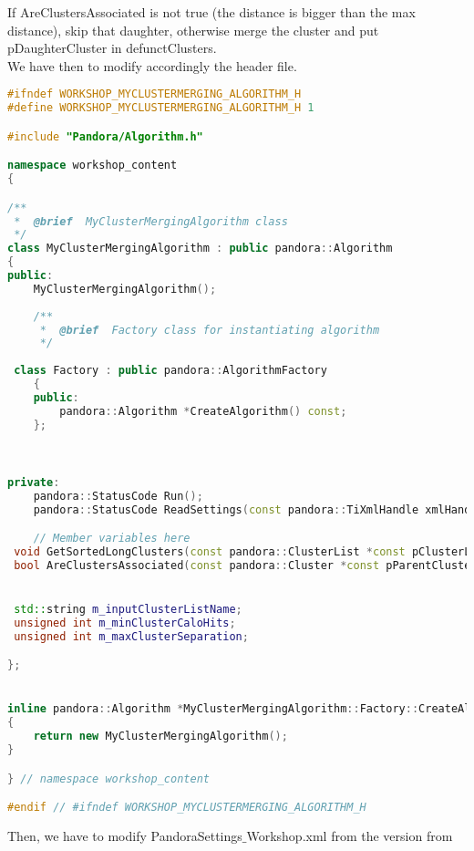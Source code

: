 If AreClustersAssociated is not true (the distance is bigger than the max distance), skip that daughter, otherwise merge the cluster and put pDaughterCluster in defunctClusters.\\
We have then to modify accordingly the header file.

\begin{lstlisting}[language=C++, caption=MyClusterMergingAlgorithm.h]
#ifndef WORKSHOP_MYCLUSTERMERGING_ALGORITHM_H
#define WORKSHOP_MYCLUSTERMERGING_ALGORITHM_H 1

#include "Pandora/Algorithm.h"

namespace workshop_content
{

/**
 *  @brief  MyClusterMergingAlgorithm class
 */
class MyClusterMergingAlgorithm : public pandora::Algorithm
{
public:
    MyClusterMergingAlgorithm();
	
    /**
     *  @brief  Factory class for instantiating algorithm
     */
  
 class Factory : public pandora::AlgorithmFactory
    {
    public:
        pandora::Algorithm *CreateAlgorithm() const;
    };


	
private:
    pandora::StatusCode Run();
    pandora::StatusCode ReadSettings(const pandora::TiXmlHandle xmlHandle);

    // Member variables here
 void GetSortedLongClusters(const pandora::ClusterList *const pClusterList, pandora::ClusterVector &sortedLongClusters) const;
 bool AreClustersAssociated(const pandora::Cluster *const pParentCluster, const pandora::Cluster *const pDaughterCluster) const;


 std::string m_inputClusterListName;
 unsigned int m_minClusterCaloHits;
 unsigned int m_maxClusterSeparation;

};


inline pandora::Algorithm *MyClusterMergingAlgorithm::Factory::CreateAlgorithm() const
{
    return new MyClusterMergingAlgorithm();
}

} // namespace workshop_content

#endif // #ifndef WORKSHOP_MYCLUSTERMERGING_ALGORITHM_H
\end{lstlisting}
Then, we have to modify PandoraSettings${\_}$Workshop.xml from the version from
